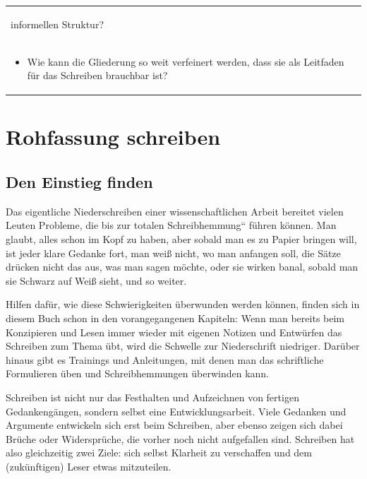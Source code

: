 \documentclass[]{book}
\providecommand{\tightlist}{%
  \setlength{\itemsep}{0pt}\setlength{\parskip}{0pt}}
\theoremstyle{definition}
\theoremstyle{definition}
\theoremstyle{definition}
\theoremstyle{remark}
\begin{document}
\begin{longtable}[]{@{}l@{}}
\begin{minipage}[t]{0.97\columnwidth}
\begin{itemize}
  informellen Struktur? \vspace{-6mm}
\end{itemize}\strut
\end{minipage}\tabularnewline
\begin{minipage}[t]{0.97\columnwidth}\raggedright\strut
\begin{itemize}
\tightlist
\item
  Wie kann die Gliederung so weit verfeinert werden, dass sie als
  Leitfaden für das Schreiben brauchbar ist? \vspace{-6mm}
\end{itemize}\strut
\end{minipage}\tabularnewline
\bottomrule
\end{longtable}

\section{Rohfassung schreiben}\label{rohfassung-schreiben}

\subsection{Den Einstieg finden}\label{den-einstieg-finden}

Das eigentliche Niederschreiben einer wissenschaftlichen Arbeit bereitet
vielen Leuten Probleme, die bis zur totalen Schreibhemmung`` führen
können. Man glaubt, alles schon im Kopf zu haben, aber sobald man es zu
Papier bringen will, ist jeder klare Gedanke fort, man weiß nicht, wo
man anfangen soll, die Sätze drücken nicht das aus, was man sagen
möchte, oder sie wirken banal, sobald man sie Schwarz auf Weiß sieht,
und so weiter.

Hilfen dafür, wie diese Schwierigkeiten überwunden werden können, finden
sich in diesem Buch schon in den vorangegangenen Kapiteln: Wenn man
bereits beim Konzipieren und Lesen immer wieder mit eigenen Notizen und
Entwürfen das Schreiben zum Thema übt, wird die Schwelle zur
Niederschrift niedriger. Darüber hinaus gibt es Trainings und
Anleitungen, mit denen man das schriftliche Formulieren üben und
Schreibhemmungen überwinden kann.

Schreiben ist nicht nur das Festhalten und Aufzeichnen von fertigen
Gedankengängen, sondern selbst eine Entwicklungsarbeit. Viele Gedanken
und Argumente entwickeln sich erst beim Schreiben, aber ebenso zeigen
sich dabei Brüche oder Widersprüche, die vorher noch nicht aufgefallen
sind. Schreiben hat also gleichzeitig zwei Ziele: sich selbst Klarheit
zu verschaffen und dem (zukünftigen) Leser etwas mitzuteilen.
\end{document}
